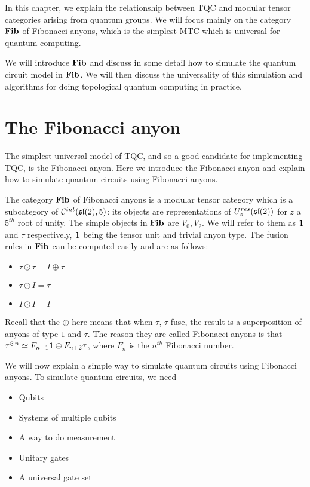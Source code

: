 In this chapter, we explain the relationship between TQC and modular tensor
categories arising from quantum groups. We will focus mainly on the category
$\mathbf{Fib}$ of Fibonacci anyons, which is the simplest MTC which is universal for
quantum computing. 

We will introduce $\mathbf{Fib}$ and discuss in some detail how to simulate the quantum
circuit model in $\mathbf{Fib}$. We will then discuss the universality of this
simulation and algorithms for doing topological quantum computing in practice.

\section{The Fibonacci anyon}
The simplest universal model of TQC, and so a good candidate for implementing TQC, is the Fibonacci anyon. Here we introduce the Fibonacci anyon
and explain how to simulate quantum circuits using Fibonacci anyons.

The category $\mathbf{Fib}$ of Fibonacci anyons is a modular tensor category which is a
subcategory of $\mathcal{C}^{int}(\mathfrak{sl}(2),5)$: its objects are representations
of $U_z^{res}(\mathfrak{sl}(2))$ for $z$ a $5^{th}$ root of unity. The simple objects in 
$\mathbf{Fib}$ are $V_0, V_2$. We will refer to them as $\mathbf{1}$ and $\tau$
respectively, $\mathbf{1}$ being the tensor unit and trivial anyon type. The
fusion rules in $\mathbf{Fib}$ can be computed easily and are as follows:

\begin{itemize}
    \item $\tau \odot \tau = I \oplus \tau$
    \item $\tau \odot I = \tau$
    \item $I \odot I = I$
\end{itemize}
Recall that the $\oplus$ here means that when $\tau$, $\tau$ fuse, the result
is a superposition of anyons of type $1$ and $\tau$.  The reason they are
called Fibonacci anyons is that $\tau^{\odot n} \simeq F_{n-1} \mathbf{1} \oplus F_{n+2}
\tau$, where $F_n$ is the $n^{th}$ Fibonacci number.

We will now explain a simple way to simulate quantum circuits using Fibonacci
anyons. To simulate quantum circuits, we need

\begin{itemize}
\item Qubits
\item Systems of multiple qubits
\item A way to do measurement
\item Unitary gates
\item A universal gate set
\end{itemize}

